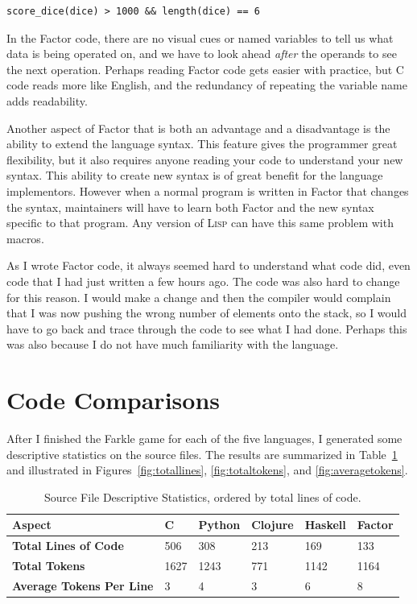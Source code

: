 \documentclass{article}
\begin{document}
\begin{verbatim}
score_dice(dice) > 1000 && length(dice) == 6
\end{verbatim}

In the Factor code, there are no visual cues or named variables to tell us what
data is being operated on, and we have to look ahead \emph{after} the operands to see
the next operation.  Perhaps reading Factor code gets easier with practice, but
C code reads more like English, and the redundancy of repeating the variable name
adds readability.

Another aspect of Factor that is both an advantage and a disadvantage is the
ability to extend the language syntax.  This feature gives the programmer great
flexibility, but it also requires anyone reading your code to understand your
new syntax.  This ability to create new syntax is of great benefit for the
language implementors.  However when a normal program is written in Factor that
changes the syntax, maintainers will have to learn both Factor and the new
syntax specific to that program.  Any version of \textsc{Lisp} can have this
same problem with macros.

As I wrote Factor code, it always seemed hard to understand what code did, even
code that I had just written a few hours ago.  The code was also hard to change
for this reason.  I would make a change and then the compiler would complain
that I was now pushing the wrong number of elements onto the stack, so I would
have to go back and trace through the code to see what I had done.  Perhaps this
was also because I do not have much familiarity with the language.

\section{Code Comparisons}

After I finished the Farkle game for each of the five languages, I generated
some descriptive statistics on the source files.  The results are summarized in
Table~\ref{tab:programcomparison} and illustrated in
Figures~\ref{fig:totallines}, \ref{fig:totaltokens}, and \ref{fig:averagetokens}.

\begin{table}[h]
    \caption{Source File Descriptive Statistics, ordered by total lines of code. \label{tab:programcomparison}}
    \begin{tabular}{|p{1.7in}|p{0.3in}|p{0.5in}|p{0.5in}|p{0.5in}|p{0.5in}|}
        \hline
        {\bf Aspect} & {\bf C} & {\bf Python} & {\bf Clojure} & {\bf Haskell} & {\bf Factor} \\
        \hline
        {\bf Total Lines of Code} & 506 & 308 & 213 & 169 & 133 \\
        \hline
        {\bf Total Tokens} & 1627 & 1243 & 771 & 1142 & 1164 \\
        \hline
        {\bf Average Tokens Per Line} & 3 & 4 & 3 & 6 & 8 \\
        \hline
    \end{tabular}
\end{table}
\end{document}
